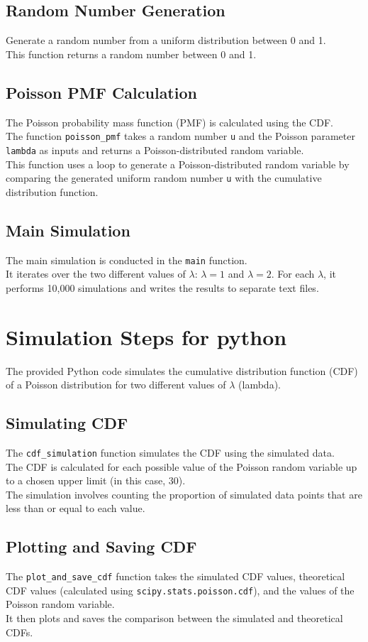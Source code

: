 \documentclass[journal,12pt,twocolumn]{IEEEtran}
\theoremstyle{remark}
\begin{document}
\subsection{Random Number Generation}
Generate a random number from a uniform distribution between 0 and 1.\\
This function returns a random number between 0 and 1.
\subsection{Poisson PMF Calculation}
The Poisson probability mass function (PMF) is calculated using the CDF.\\ 
The function \texttt{poisson\_pmf} takes a random number \texttt{u} and the Poisson parameter \texttt{lambda} as inputs and returns a Poisson-distributed random variable.\\
This function uses a loop to generate a Poisson-distributed random variable by comparing the generated uniform random number \texttt{u} with the cumulative distribution function.
\subsection{Main Simulation}
The main simulation is conducted in the \texttt{main} function.\\ 
It iterates over the two different values of $\lambda$: $\lambda = 1$ and $\lambda = 2$. For each $\lambda$, it performs 10,000 simulations and writes the results to separate text files.
\section{Simulation Steps for python}
The provided Python code simulates the cumulative distribution function (CDF) of a Poisson distribution for two different values of $\lambda$ (lambda).
\subsection{Simulating CDF}
The \texttt{cdf\_simulation} function simulates the CDF using the simulated data.\\ 
The CDF is calculated for each possible value of the Poisson random variable up to a chosen upper limit (in this case, 30).\\ 
The simulation involves counting the proportion of simulated data points that are less than or equal to each value.
\subsection{Plotting and Saving CDF}
The \texttt{plot\_and\_save\_cdf} function takes the simulated CDF values, theoretical CDF values (calculated using \texttt{scipy.stats.poisson.cdf}), and the values of the Poisson random variable.\\ 
It then plots and saves the comparison between the simulated and theoretical CDFs.
\end{document}
